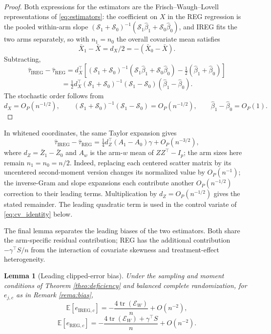 \documentclass{article}
\newcommand{\EEE}{\mathbb{E}}
\newcommand{\htau}{\hat{\tau}}
\newcommand{\hbeta}{\hat{\beta}}
\DeclareMathOperator{\tr}{tr}
\newcommand{\IREG}{\mathrm{IREG}}
\newcommand{\REG}{\mathrm{REG}}
\theoremstyle{plain}
\newtheorem{lemm}[prop]{Lemma}
\theoremstyle{definition}
\theoremstyle{remark}
\begin{document}
\begin{proof}
Both expressions for the estimators are the Frisch--Waugh--Lovell
representations of \eqref{eq:estimators}: the coefficient on $X$ in the REG regression is the pooled within-arm slope
$(\mathcal S_1+\mathcal S_0)^{-1}
(\mathcal S_1\hbeta_1+\mathcal S_0\hbeta_0)$, and IREG fits the two arms separately, so with $n_1=n_0$ the overall covariate mean satisfies
\[
\bar X_1-\bar X
=
d_X/2
=
-(\bar X_0-\bar X).
\]
Subtracting,
\[
\htau_\IREG-\htau_\REG
=
d_X^\top
\left[
(\mathcal S_1+\mathcal S_0)^{-1}
(\mathcal S_1\hbeta_1+\mathcal S_0\hbeta_0)
-
\tfrac12(\hbeta_1+\hbeta_0)
\right]
\]
\[
=
\tfrac12d_X^\top
(\mathcal S_1+\mathcal S_0)^{-1}
(\mathcal S_1-\mathcal S_0)
(\hbeta_1-\hbeta_0).
\]
The stochastic order follows from
\[
d_X=O_P(n^{-1/2}),
\qquad
(\mathcal S_1+\mathcal S_0)^{-1}
(\mathcal S_1-\mathcal S_0)=O_P(n^{-1/2}),
\qquad
\hbeta_1-\hbeta_0=O_P(1).
\]
\end{proof}

In whitened coordinates, the same Taylor expansion gives
\[
\htau_\IREG-\htau_\REG
=\tfrac14d_Z^\top(A_1-A_0)\gamma+O_P(n^{-3/2}),
\]
where $d_Z=\bar Z_1-\bar Z_0$ and $A_w$ is the arm-$w$ mean
of $ZZ^\top-I_p$; the arm sizes here remain $n_1=n_0=n/2$.
Indeed, replacing each centered scatter matrix by its uncentered
second-moment version changes its normalized value by $O_P(n^{-1})$;
the inverse-Gram and slope expansions each contribute another
$O_P(n^{-1/2})$ correction to their leading terms. Multiplication
by $d_Z=O_P(n^{-1/2})$ gives the stated remainder.
The leading quadratic term is used in the control variate of
\eqref{eq:cv_identity} below.

The final lemma separates the leading biases of the two estimators.
Both share the arm-specific residual contribution; REG has the
additional contribution $-\gamma^\top S/n$ from the interaction of
covariate skewness and treatment-effect heterogeneity.

\begin{lemm}[Leading clipped-error bias]
\label{lemm:bias}
Under the sampling and moment conditions of Theorem \ref{theo:deficiency} and balanced complete randomization, for $e_{j,c}$ as in Remark \ref{rema:bias},
\[
\EEE[e_{\IREG,c}]
=
-\frac{4\tr(\mathcal E_W)}{n}+O(n^{-2}),
\]
\[
\EEE[e_{\REG,c}]
=
-\frac{4\tr(\mathcal E_W)+\gamma^\top S}{n}+O(n^{-2}).
\]
\end{lemm}
\end{document}

